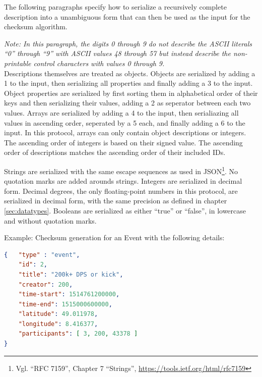 \documentclass[parskip=full,11pt]{scrartcl}
\begin{document}
\par The following paragraphs specify how to serialize a recursively complete
description into a unambiguous form that can then be used as the input for the
checksum algorithm.

\par \textit{Note: In this paragraph, the digits 0 through 9 do not describe
the ASCII literals \enquote{0} through \enquote{9} with ASCII values 48 through
57 but instead describe the non-printable control characters with values 0
through 9.}\\
Descriptions themselves are treated as objects.
Objects are serialized by adding a 1 to the input, then serializing all
properties and finally adding a 3 to the input.
Object properties are serialized by first sorting them in alphabetical order of
their keys and then serializing their values, adding a 2 as seperator between
each two values.
Arrays are serialized by adding a 4 to the input, then serialiazing all values
in ascending order, seperated by a 5 each, and finally adding a 6 to the input.
In this protocol, arrays can only contain object descriptions or integers.
The ascending order of integers is based on their signed value.
The ascending order of descriptions matches the ascending order of their
included IDs.

Strings are serialized with the same escape sequences as used in
JSON\footnote{Vgl. \enquote{RFC 7159}, Chapter 7 \enquote{Strings},
\url{https://tools.ietf.org/html/rfc7159}}.
No quotation marks are added arounds strings.
Integers are serialized in decimal form.
Decimal degrees, the only floating-point numbers in this protocol, are
serialized in decimal form, with the same precision as defined in chapter
\ref{sec:datatypes}.
Booleans are serialized as either \enquote{true} or \enquote{false}, in
lowercase and without quotation marks.

\par Example: Checksum generation for an Event with the following details:
\begin{lstlisting}[language=json,firstnumber=1]
{   "type" : "event",
    "id": 2,
    "title": "200k+ DPS or kick",
    "creator": 200,
    "time-start": 1514761200000,
    "time-end": 1515000600000,
    "latitude": 49.011978,
    "longitude": 8.416377,
    "participants": [ 3, 200, 43378 ]
}
\end{lstlisting}

\newcommand*\circled[1]{\tikz[baseline=(char.base)]{
            \node[shape=circle,draw,inner sep=1pt] (char) {\scriptsize #1};}}
\end{document}
